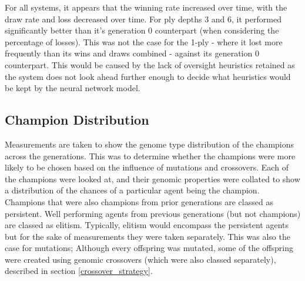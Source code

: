 \documentclass[12pt,a4paper]{article}
\begin{document}
    For all systems, it appears that the winning rate increased over time, with the draw rate and loss decreased over time. For ply depths 3 and 6, it performed significantly better than it's generation 0 counterpart (when considering the percentage of losses). This was not the case for the 1-ply - where it lost more frequently than its wins and draws combined - against its generation 0 counterpart. This would be caused by the lack of oversight heuristics retained as the system does not look ahead further enough to decide what heuristics would be kept by the neural network model.

    \subsection{Champion Distribution}
        Measurements are taken to show the genome type distribution of the champions across the generations.
        This was to determine whether the champions were more likely to be chosen based on the influence of mutations and crossovers. Each of the champions were looked at, and their genomic properties were collated to show a distribution of the chances of a particular agent being the champion. Champions that were also champions from prior generations are classed as persistent. Well performing agents from previous generations (but not champions) are classed as elitism. Typically, elitism would encompass the persistent agents but for the sake of measurements they were taken separately. This was also the case for mutations; Although every offspring was mutated, some of the offspring were created using genomic crossovers (which were also classed separately), described in section \ref{crossover_strategy}.  
\end{document}
